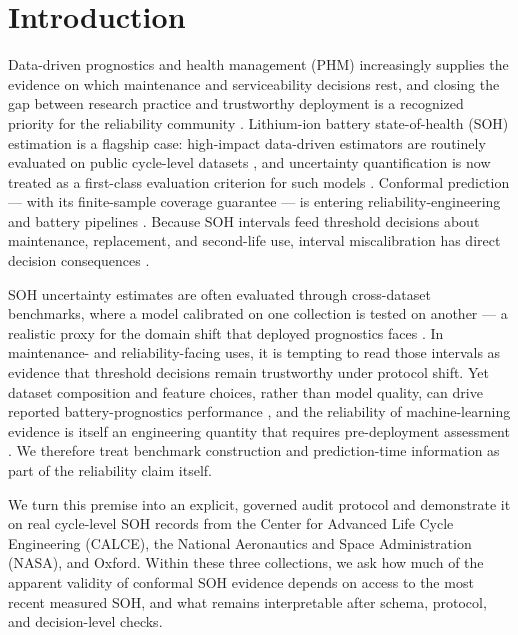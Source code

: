 \documentclass[
  number,
  preprint]{elsarticle}
\begin{document}
\section{Introduction}\label{introduction}

Data-driven prognostics and health management (PHM) increasingly
supplies the evidence on which maintenance and serviceability decisions
rest, and closing the gap between research practice and trustworthy
deployment is a recognized priority for the reliability community
\citep{zio2022prognostics, lin2026recent}. Lithium-ion battery
state-of-health (SOH) estimation is a flagship case: high-impact
data-driven estimators are routinely evaluated on public cycle-level
datasets \citep{wang2023improved, meng2023long}, and uncertainty
quantification is now treated as a first-class evaluation criterion for
such models \citep{basora2025benchmark, nemani2023uncertainty}.
Conformal prediction --- with its finite-sample coverage guarantee ---
is entering reliability-engineering and battery pipelines
\citep{xu2026uncertaintyaware, javanmardi2023conformal, soon2026enhancing}.
Because SOH intervals feed threshold decisions about maintenance,
replacement, and second-life use, interval miscalibration has direct
decision consequences
\citep{mitici2023dynamic, zhuang2023prognostic, wang2026multiaction}.

SOH uncertainty estimates are often evaluated through cross-dataset
benchmarks, where a model calibrated on one collection is tested on
another --- a realistic proxy for the domain shift that deployed
prognostics faces \citep{nejjar2024domain}. In maintenance- and
reliability-facing uses, it is tempting to read those intervals as
evidence that threshold decisions remain trustworthy under protocol
shift. Yet dataset composition and feature choices, rather than model
quality, can drive reported battery-prognostics performance
\citep{nagulapati2021capacity, geslin2023selecting}, and the reliability
of machine-learning evidence is itself an engineering quantity that
requires pre-deployment assessment \citep{chen2024evaluating}. We
therefore treat benchmark construction and prediction-time information
as part of the reliability claim itself.

We turn this premise into an explicit, governed audit protocol and
demonstrate it on real cycle-level SOH records from the Center for
Advanced Life Cycle Engineering (CALCE), the National Aeronautics and
Space Administration (NASA), and Oxford. Within these three collections,
we ask how much of the apparent validity of conformal SOH evidence
depends on access to the most recent measured SOH, and what remains
interpretable after schema, protocol, and decision-level checks.
\end{document}

